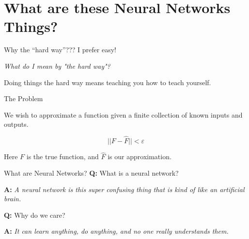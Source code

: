 \documentclass[11pt]{beamer}
\let\epsilon=\varepsilon
\begin{document}
\section{What are these Neural Networks Things?}

\begin{frame}{Why the ``hard way''??? I prefer easy!}

\emph{What do I mean by "the hard way"?}

\bigskip

\bigskip	

Doing things the hard way means teaching you how to teach yourself.

\end{frame}

\begin{frame}{The Problem}

We wish to approximate a function given a finite collection of known inputs and outputs.

\bigskip

$$||F - \widehat{F}|| < \epsilon$$

\bigskip

Here $F$ is the true function, and $\widehat{F}$ is our approximation.
\end{frame}

\begin{frame}{What are Neural Networks?}
\textbf{Q:} What is a neural network?

\bigskip 

\textbf{A:} \emph{A neural network is this super confusing thing that is kind of like an artificial brain.}

\bigskip 

\textbf{Q:} Why do we care?

\bigskip 

\textbf{A:} \emph{It can learn anything, do anything, and no one really understands them.}
\end{frame}
\end{document}
